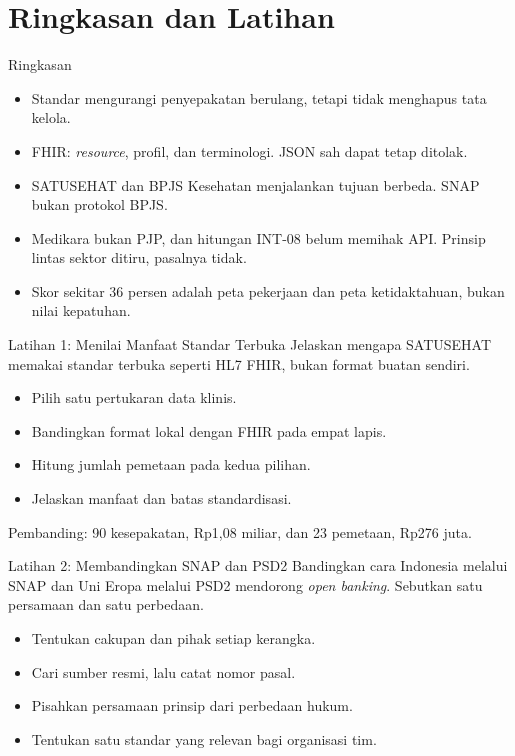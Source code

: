 \documentclass[aspectratio=169, table, 12pt]{beamer}
\begin{document}
\section{Ringkasan dan Latihan}

\begin{frame}{{\Large Ringkasan}}
  \vspace{6pt}
  \begin{itemize}
    \item Standar mengurangi penyepakatan berulang, tetapi tidak menghapus tata kelola.
    \item FHIR: \textit{resource}, profil, dan terminologi. JSON sah dapat tetap ditolak.
    \item SATUSEHAT dan BPJS Kesehatan menjalankan tujuan berbeda. SNAP bukan protokol BPJS.
    \item Medikara bukan PJP, dan hitungan INT-08 belum memihak API. Prinsip lintas sektor ditiru, pasalnya tidak.
    \item Skor sekitar 36 persen adalah peta pekerjaan dan peta ketidaktahuan, bukan nilai kepatuhan.
  \end{itemize}
\end{frame}

\begin{frame}{{\Large Latihan 1: Menilai Manfaat Standar Terbuka}}
  \vspace{8pt}
  Jelaskan mengapa SATUSEHAT memakai standar terbuka seperti HL7 FHIR, bukan format buatan sendiri.
  \vspace{6pt}
  \begin{itemize}
    \item Pilih satu pertukaran data klinis.
    \item Bandingkan format lokal dengan FHIR pada empat lapis.
    \item Hitung jumlah pemetaan pada kedua pilihan.
    \item Jelaskan manfaat dan batas standardisasi.
  \end{itemize}
  \vspace{4pt}
  {\small Pembanding: 90 kesepakatan, Rp1,08 miliar, dan 23 pemetaan, Rp276 juta.}
\end{frame}

\begin{frame}{{\Large Latihan 2: Membandingkan SNAP dan PSD2}}
  \vspace{8pt}
  Bandingkan cara Indonesia melalui SNAP dan Uni Eropa melalui PSD2 mendorong \textit{open banking}. Sebutkan satu persamaan dan satu perbedaan.
  \vspace{6pt}
  \begin{itemize}
    \item Tentukan cakupan dan pihak setiap kerangka.
    \item Cari sumber resmi, lalu catat nomor pasal.
    \item Pisahkan persamaan prinsip dari perbedaan hukum.
    \item Tentukan satu standar yang relevan bagi organisasi tim.
  \end{itemize}
\end{frame}
\end{document}
